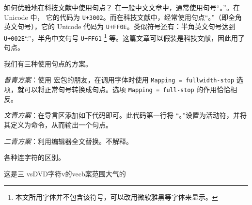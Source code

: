 \begin{myQA}{如何优雅地在科技文献中使用句点？}
	在一般中文文章中，通常使用句号“{。}”。在 Unicode 中，
	它的代码为 \verb|U+3002|。而在科技文献中，经常使用句点“。”（即全角
	英文句号），它的 Unicode 代码为 \verb|U+FF0E|。类似符号还有：半角英文句号达到
	\verb|U+002E|“.”，半角中文句号 \verb|U+FF61|
	\footnote{本文所用字体并不包含该符号，可以改用微软雅黑等字体来显示。}
	等。这篇文章可以假装是科技文献，因此用了句点。
	
	我们有三种使用句点的方案。
	
	\emph{普青方案}：使用   宏包的朋友，在调用字体时使用
	\verb|Mapping = fullwidth-stop| 选项，就可以将正常句号转换成句点。选项
	\verb|Mapping = full-stop| 的作用恰恰相反。
	
	\emph{文青方案}：在导言区添加如下代码即可。此代码第一行将
	“{。}”设置为活动符，并将其定义为命令，从而输出一个句点。
	
	\emph{二青方案}：利用编辑器全文替换。不解释。
	
\end{myQA}

\begin{myQA}{各种连字符的区别。}
	
\end{myQA}

\begin{myQA}{这是三}
	vsDVD字符v的vecb案范围大气的
\end{myQA}